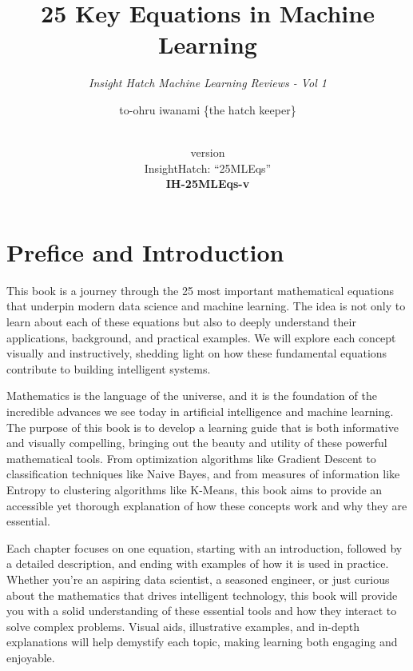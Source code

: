 \documentclass[
  12 pt,
  a4paper,
]{book}
\title{25 Key Equations in Machine Learning}
\subtitle{\textit{Insight Hatch Machine Learning Reviews - Vol 1}}
\author{to-ohru iwanami \{the hatch keeper\}}
\date{\vhCurrentDate\\
version \vhCurrentVersion\\
InsightHatch: ``25MLEqs''\\
\textbf{IH-25MLEqs-v}\textbf{\vhCurrentVersion}}
\numberwithin{equation}{section}
\theoremstyle{plain}      %
\theoremstyle{definition} %
\theoremstyle{remark}     %
\theoremstyle{note}         %
\begin{document}
\frontmatter
\maketitle

{
\setcounter{tocdepth}{1}
\tableofcontents
}
\mainmatter
\hfill\break

\begin{versionhistory}
\end{versionhistory}
\newpage

\setcounter{table}{0}

\frontmatter

\hypertarget{prefice-and-introduction}{%
\chapter{Prefice and Introduction}\label{prefice-and-introduction}}

This book is a journey through the 25 most important mathematical
equations that underpin modern data science and machine learning. The
idea is not only to learn about each of these equations but also to
deeply understand their applications, background, and practical
examples. We will explore each concept visually and instructively,
shedding light on how these fundamental equations contribute to building
intelligent systems.

Mathematics is the language of the universe, and it is the foundation of
the incredible advances we see today in artificial intelligence and
machine learning. The purpose of this book is to develop a learning
guide that is both informative and visually compelling, bringing out the
beauty and utility of these powerful mathematical tools. From
optimization algorithms like Gradient Descent to classification
techniques like Naive Bayes, and from measures of information like
Entropy to clustering algorithms like K-Means, this book aims to provide
an accessible yet thorough explanation of how these concepts work and
why they are essential.

Each chapter focuses on one equation, starting with an introduction,
followed by a detailed description, and ending with examples of how it
is used in practice. Whether you're an aspiring data scientist, a
seasoned engineer, or just curious about the mathematics that drives
intelligent technology, this book will provide you with a solid
understanding of these essential tools and how they interact to solve
complex problems. Visual aids, illustrative examples, and in-depth
explanations will help demystify each topic, making learning both
engaging and enjoyable.
\end{document}
